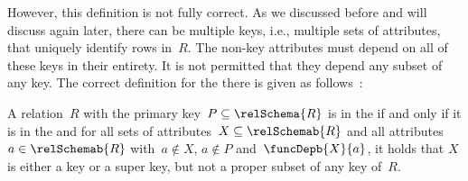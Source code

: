 However, this definition is not fully correct.
As we discussed before and will discuss again later, there can be multiple keys, i.e., multiple sets of attributes, that uniquely identify rows in~$R$.
The non-key attributes must depend on all of these keys in their entirety.
It is not permitted that they depend any subset of any key.
The correct definition for the  there is given as follows~\cite{SS2005EIDDDFDB:SDWSD2}:%
%
\begin{definition}%
\label{def:2nf}%
A relation~$R$ with the primary key~$P\subseteq\relSchema{R}$ is in the  if and only if it is in the  and for all sets of attributes~$X\subseteq\relSchemab{R}$ and all attributes~$a\in\relSchemab{R}$ with~$a\not\in X$, $a\not\in P$ and~$\funcDepb{X}{a}$, it holds that $X$ is either a key or a super key, but not a proper subset of any key of~$R$.%
\end{definition}%
%
%
%
%
\endhsection%
%
